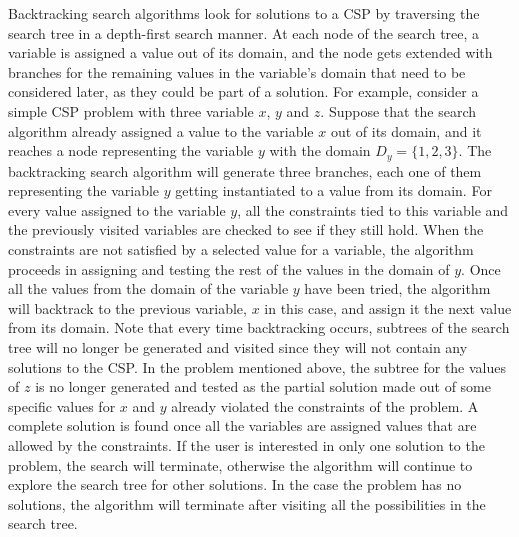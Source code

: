 \documentclass{l4proj}
\begin{document}
\noindent Backtracking search algorithms look for solutions to a CSP by traversing the search tree in a depth-first search manner. At each node of the search tree, a variable is assigned a value out of its domain, and the node gets extended with branches for the remaining values in the variable’s domain that need to be considered later, as they could be part of a solution. For example, consider a simple CSP problem with three variable $x$, $y$ and $z$. Suppose that the search algorithm already assigned a value to the variable $x$ out of its domain, and it reaches a node representing the variable $y$ with the domain $D_y = \{1, 2, 3\}$. The backtracking search algorithm will generate three branches, each one of them representing the variable $y$ getting instantiated to a value from its domain. For every value assigned to the variable $y$, all the constraints tied to this variable and the previously visited variables are checked to see if they still hold. When the constraints are not satisfied by a selected value for a variable, the algorithm proceeds in assigning and testing the rest of the values in the domain of $y$. Once all the values from the domain of the variable $y$ have been tried, the algorithm will backtrack to the previous variable, $x$ in this case, and assign it the next value from its domain. Note that every time backtracking occurs, subtrees of the search tree will no longer be generated and visited since they will not contain any solutions to the CSP. In the problem mentioned above, the subtree for the values of $z$ is no longer generated and tested as the partial solution made out of some specific values for $x$ and $y$ already violated the constraints of the problem. A complete solution is found once all the variables are assigned values that are allowed by the constraints. If the user is interested in only one solution to the problem, the search will terminate, otherwise the algorithm will continue to explore the search tree for other solutions. In the case the problem has no solutions, the algorithm will terminate after visiting all the possibilities in the search tree.
\end{document}
